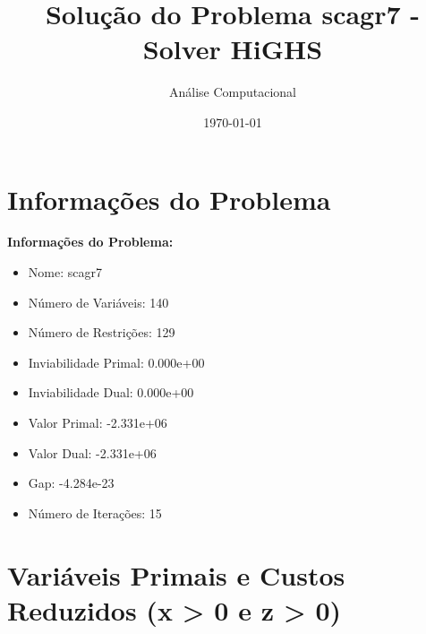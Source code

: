 \documentclass[12pt]{article}
\title{Solução do Problema scagr7 - Solver HiGHS}
\author{Análise Computacional}
\date{\today}
\begin{document}
\maketitle

\section{Informações do Problema}

\textbf{Informações do Problema:}
\begin{itemize}
\item Nome: scagr7
\item Número de Variáveis: 140
\item Número de Restrições: 129
\item Inviabilidade Primal: 0.000e+00
\item Inviabilidade Dual: 0.000e+00
\item Valor Primal: -2.331e+06
\item Valor Dual: -2.331e+06
\item Gap: -4.284e-23
\item Número de Iterações: 15
\end{itemize}


\section{Variáveis Primais e Custos Reduzidos (x > 0 e z > 0)}
\end{document}
